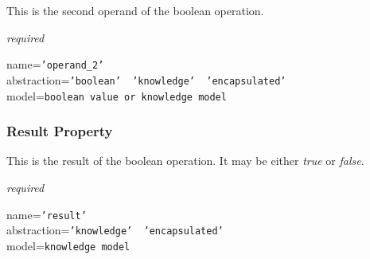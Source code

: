 This is the second operand of the boolean operation.

\emph{required}

name=\texttt{'operand\_2'}\\
abstraction=\texttt{'boolean' \vline\ 'knowledge' \vline\ 'encapsulated'}\\
model=\texttt{boolean value or knowledge model}

\subsubsection{Result Property}

This is the result of the boolean operation. It may be either \emph{true} or
\emph{false}.

\emph{required}

name=\texttt{'result'}\\
abstraction=\texttt{'knowledge' \vline\ 'encapsulated'}\\
model=\texttt{knowledge model}
